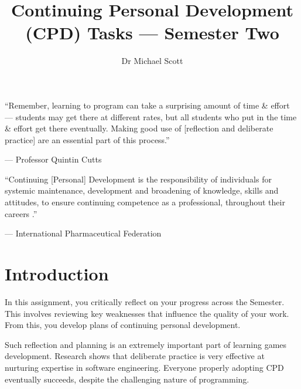 \documentclass{../fal_assignment}
\title{Continuing Personal Development (CPD) Tasks --- Semester Two}
\author{Dr Michael Scott}
\begin{document}
\maketitle
%    
\begin{marginquote}
    ``Remember, learning to program can take a surprising amount of time \& effort --- students may get there at different rates, but all students who put in the time \& effort get there eventually. Making good use of [reflection and deliberate practice] are an essential part of this process.''
    
    --- Professor Quintin Cutts

    \marginquoterule

    ``Continuing [Personal] Development is the responsibility of individuals for systemic maintenance, development and broadening of knowledge, skills and attitudes, to ensure continuing competence as a professional, throughout their careers .''
    
    --- International Pharmaceutical Federation
\end{marginquote}

\section*{Introduction}

In this assignment, you critically reflect on your progress across the Semester. This involves reviewing key weaknesses that influence the quality of your work. From this, you develop plans of continuing personal development.

Such reflection and planning is an extremely important part of learning games development. Research shows that deliberate practice is very effective at nurturing expertise in software engineering. Everyone properly adopting CPD eventually succeeds, despite the challenging nature of programming.
\end{document}
